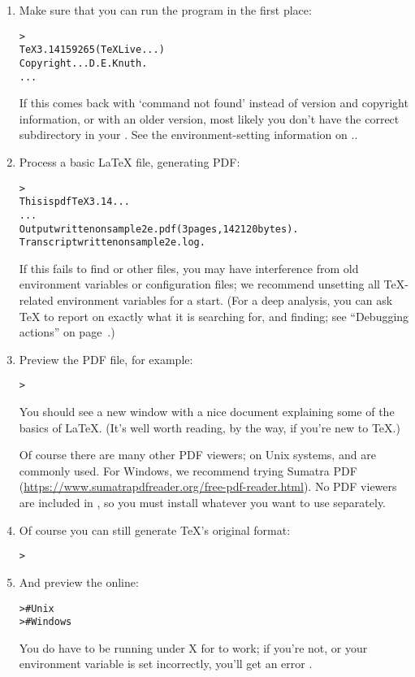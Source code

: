 \documentclass{article}
\begin{document}
\begin{enumerate}

\item Make sure that you can run the  program in the first
place:
\begin{alltt}
> 
TeX 3.14159265 (TeX Live ...)
Copyright ... D.E. Knuth.
...
\end{alltt}
If this comes back with `command not found' instead of version and
copyright information, or with an older version, most likely you don't
have the correct  subdirectory in your .  See
the environment-setting information on \p.\pageref{sec:env}.

\item Process a basic \LaTeX{} file, generating PDF:
\begin{alltt}
> 
This is pdfTeX 3.14...
...
Output written on sample2e.pdf (3 pages, 142120 bytes).
Transcript written on sample2e.log.
\end{alltt}
If this fails to find  or other files,
you may have interference from old environment variables or
configuration files; we recommend unsetting all \TeX-related environment
variables for a start.  (For a deep analysis, you can ask \TeX{} to
report on exactly what it is searching for, and finding; see ``Debugging
actions'' on page~\pageref{sec:debugging}.)

\item Preview the PDF file, for example:
\begin{alltt}
> 
\end{alltt}
You should see a new window with a nice document explaining some of the
basics of \LaTeX{}.  (It's well worth reading, by the way, if you're new
to \TeX.)  

Of course there are many other PDF viewers; on Unix systems,
 and  are commonly used. For Windows, we
recommend trying Sumatra PDF
(\url{https://www.sumatrapdfreader.org/free-pdf-reader.html}). No PDF
viewers are included in \TL{}, so you must install whatever you want to
use separately.

\item Of course you can still generate \TeX's original \dvi{} format:
\begin{alltt}
> 
\end{alltt}

\item And preview the \dvi{} online:
\begin{alltt}
>     # Unix
>   # Windows
\end{alltt}
You do have to be running under X for  to work; if
you're not, or your  environment variable is set
incorrectly, you'll get an error .


\end{enumerate}
\end{document}
